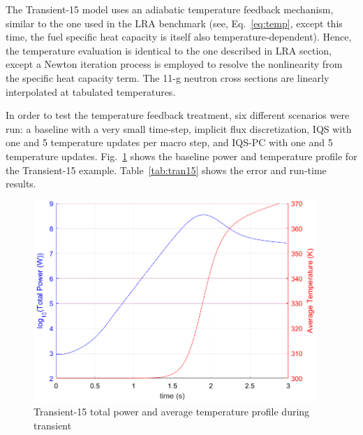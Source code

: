 \documentclass{elsarticle}
\renewcommand{\vec}[1]{\bm{#1}} %
\newcommand{\fig}[1]{Fig.~\ref{#1}}                      %
\newcommand{\tbl}[1]{Table~\ref{#1}}                     %
\newcommand{\iqspc}{IQS-PC\xspace}
\newcommand{\be}{\begin{equation}}
\newcommand{\ee}{\end{equation}}
\begin{document}
The Transient-15 model uses an adiabatic temperature feedback mechanism, similar to the one used in the LRA benchmark (see, Eq.~\eqref{eq:temp}, except this time, the fuel specific heat capacity is itself also temperature-dependent). Hence, the temperature evaluation is identical to the one described in LRA section, except a Newton iteration process is employed to resolve the nonlinearity from the specific heat capacity term.  The 11-g neutron cross sections are linearly interpolated at tabulated temperatures.
%



In order to test the temperature feedback treatment, six different scenarios were run: a baseline with a very small time-step, implicit flux discretization, IQS with one and 5 temperature updates per macro step, and \iqspc with one and 5 temperature updates.  \fig{fig:Tran15_profile} shows the baseline power and temperature profile for the Transient-15 example.  \tbl{tab:tran15} shows the error and run-time results.

\begin{figure}[htbp!]
\centering
\includegraphics[height=3in]{figures/Tran15_profile.png}
\caption{Transient-15 total power and average temperature profile during transient}
\label{fig:Tran15_profile}
\end{figure}
\end{document}
